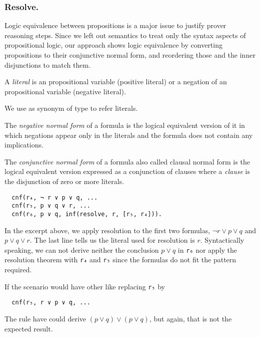\documentclass[../../main.tex]{subfiles}
\begin{document}
\subsubsection{Resolve.}
\label{sssec:resolve}

Logic equivalence between propositions is a major issue to justify
prover reasoning steps. Since we left out semantics to treat only the
syntax aspects of propositional logic, our approach shows logic
equivalence by converting propositions to their conjunctive normal
form, and reordering those and the inner disjunctions to match them.

\begin{mydefinition}

A \emph{literal} is an propositional variable (positive literal) or a
negation of an propositional variable (negative literal).

\end{mydefinition}

\begin{notation}
We use \Lit as synonym of \Prop type to refer literals.
\end{notation}

\begin{mydefinition}

The \emph{negative normal form} of a formula is the logical
equivalent version of it in which negations appear only in the
literals and the formula does not contain any implications.

\end{mydefinition}

\begin{mydefinition}

The \emph{conjunctive normal form} of a formula also called clausal
normal form is the logical equivalent version expressed as a
conjunction of clauses where a \emph{clause} is the disjunction of
zero or more literals.

\end{mydefinition}

\begin{myexamplenum}\hspace{10cm}
\label{ex:resolve-tstp}
\begin{verbatim}
  cnf(r₄, ¬ r ∨ p ∨ q, ...
  cnf(r₅, p ∨ q ∨ r, ...
  cnf(r₆, p ∨ q, inf(resolve, r, [r₅, r₄])).
\end{verbatim}

In the excerpt above, we apply resolution to the first two formulas,
$¬ r ∨ p ∨ q$ and $p ∨ q ∨ r$.
The last line tells us the literal used
for resolution is $r$. Syntactically speaking, we can not derive
neither the conclusion $p ∨ q$ in \verb!r₆! nor apply the resolution
theorem with \verb!r₄! and \verb!r₅! since the formulas do not fit
the pattern required.

If the scenario would have other like replacing \verb!r₅! by
\begin{verbatim}
  cnf(r₅, r ∨ p ∨ q, ...
\end{verbatim}
The \resolve rule have could derive $(p ∨ q) ∨ (p ∨ q)$, but again, that is not the expected result.
\end{myexamplenum}
\end{document}

